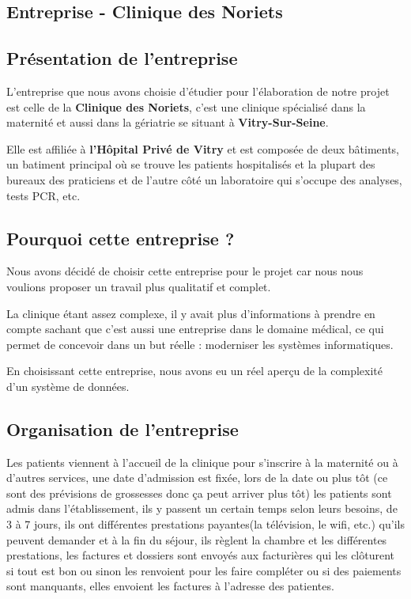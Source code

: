 \documentclass[12pt]{article}
\begin{document}
    
    {\selectfont
    \begin{adjustwidth}{20pt}{20pt}
    \tableofcontents
    \newpage

    
    \section{Entreprise - Clinique des Noriets}
    \subsection{Présentation de l'entreprise}
    
    L’entreprise que nous avons choisie d’étudier pour l’élaboration de notre projet est celle de la \textbf{Clinique des Noriets}, c’est une clinique spécialisé dans la maternité et aussi dans la gériatrie se situant à \textbf{Vitry-Sur-Seine}.\bigskip

    Elle est affiliée à \textbf{l’Hôpital Privé de Vitry} et est composée de deux bâtiments, un batiment principal où se trouve les patients hospitalisés et la plupart des bureaux des praticiens et de l’autre côté un laboratoire qui s’occupe des analyses, tests PCR, etc.
    
    \subsection{Pourquoi cette entreprise ?}
    Nous avons décidé de choisir cette entreprise pour le projet car nous nous voulions proposer un travail plus qualitatif et complet.\bigskip
    
    La clinique étant assez complexe, il y avait plus d’informations à prendre en compte sachant que c’est aussi une entreprise dans le domaine médical, ce qui permet de concevoir dans un but réelle : moderniser les systèmes informatiques.\bigskip
    
    En choisissant cette entreprise, nous avons eu un réel aperçu de la complexité d’un système de données.
    
    \subsection{Organisation de l'entreprise}
    
    Les patients viennent à l’accueil de la clinique pour s’inscrire à la maternité ou à d’autres services, une date d’admission est fixée, lors de la date ou plus tôt (ce sont des prévisions de grossesses donc ça peut arriver plus tôt) les patients sont admis dans l’établissement, ils y passent un certain temps selon leurs besoins, de 3 à 7 jours, ils ont différentes prestations payantes(la télévision, le wifi, etc.) qu’ils peuvent demander et à la fin du séjour, ils règlent la chambre et les différentes prestations, les factures et dossiers sont envoyés aux facturières qui les clôturent si tout est bon ou sinon les renvoient pour les faire compléter ou si des paiements sont manquants, elles envoient les factures à l’adresse des patientes.\bigskip
    

\end{adjustwidth}}
\end{document}

